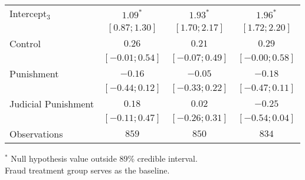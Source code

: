 \begin{table}[h]
\begin{center}
\begin{threeparttable}
\begin{tabular}{l c c c}
Intercept$_3$       & $1.09^{*}$        & $1.93^{*}$        & $1.96^{*}$        \\
                    & $ [ 0.87;  1.30]$ & $ [ 1.70;  2.17]$ & $ [ 1.72;  2.20]$ \\
Control             & $0.26$            & $0.21$            & $0.29$            \\
                    & $ [-0.01;  0.54]$ & $ [-0.07;  0.49]$ & $ [-0.00;  0.58]$ \\
Punishment          & $-0.16$           & $-0.05$           & $-0.18$           \\
                    & $ [-0.44;  0.12]$ & $ [-0.33;  0.22]$ & $ [-0.47;  0.11]$ \\
Judicial Punishment & $0.18$            & $0.02$            & $-0.25$           \\
                    & $ [-0.11;  0.47]$ & $ [-0.26;  0.31]$ & $ [-0.54;  0.04]$ \\
\hline
Observations        & $859$             & $850$             & $834$             \\
\hline
\end{tabular}
\begin{tablenotes}[flushleft]
\scriptsize{$^*$ Null hypothesis value outside 89\% credible interval.  \\
Fraud treatment group serves as the baseline.}
\end{tablenotes}
\end{threeparttable}
\label{table:coefficients}
\end{center}
\end{table}
